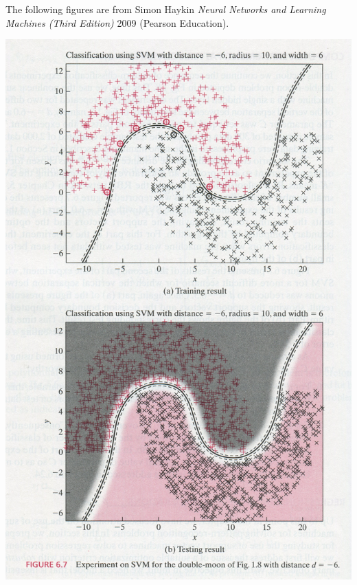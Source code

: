\begin{enumerate}
  \begin{solution}
    The following figures are from Simon Haykin \emph{Neural Networks
      and Learning Machines (Third Edition)} 2009 (Pearson Education).

    \begin{center}
      \includegraphics[width=0.7\linewidth]{ex08_05_svm.jpg}
    \end{center}
  \end{solution}
    
\end{enumerate}

